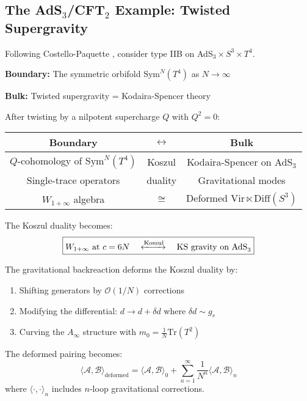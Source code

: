 \subsection{The AdS$_3$/CFT$_2$ Example: Twisted Supergravity}

\begin{example}\label{ex:AdS3}
Following Costello-Paquette \cite{CP2020}, consider type IIB on AdS$_3 \times S^3 \times T^4$.

\textbf{Boundary:} The symmetric orbifold $\text{Sym}^N(T^4)$ as $N \to \infty$

\textbf{Bulk:} Twisted supergravity = Kodaira-Spencer theory

After twisting by a nilpotent supercharge $Q$ with $Q^2 = 0$:

\begin{center}
\begin{tabular}{|c|c|c|}
\hline
\textbf{Boundary} & $\leftrightarrow$ & \textbf{Bulk} \\
\hline
$Q$-cohomology of $\text{Sym}^N(T^4)$ & Koszul & Kodaira-Spencer on AdS$_3$ \\
Single-trace operators & duality & Gravitational modes \\
$W_{1+\infty}$ algebra & $\cong$ & Deformed $\text{Vir} \ltimes \text{Diff}(S^3)$ \\
\hline
\end{tabular}
\end{center}

The Koszul duality becomes:
$$\boxed{W_{1+\infty} \text{ at } c = 6N \quad \xleftrightarrow{\text{Koszul}} \quad \text{KS gravity on AdS}_3}$$
\end{example}

\begin{theorem}\label{thm:backreaction}
The gravitational backreaction deforms the Koszul duality by:
\begin{enumerate}
\item Shifting generators by $\mathcal{O}(1/N)$ corrections
\item Modifying the differential: $d \to d + \delta d$ where $\delta d \sim g_s$
\item Curving the $A_\infty$ structure with $m_0 = \frac{1}{N}\text{Tr}(T^2)$
\end{enumerate}

The deformed pairing becomes:
$$\langle \mathcal{A}, \mathcal{B} \rangle_{\text{deformed}} = \langle \mathcal{A}, \mathcal{B} \rangle_0 + \sum_{n=1}^\infty \frac{1}{N^n} \langle \mathcal{A}, \mathcal{B} \rangle_n$$
where $\langle \cdot, \cdot \rangle_n$ includes $n$-loop gravitational corrections.
\end{theorem}

